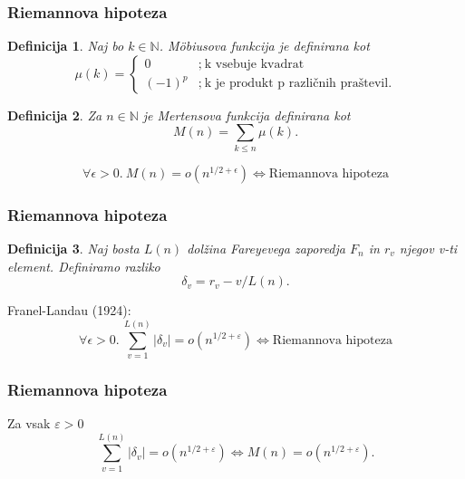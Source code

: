 \documentclass{beamer}
\newtheorem{definicija}{Definicija}
\begin{document}
\begin{frame}
\frametitle{Riemannova hipoteza}

\begin{definicija}
Naj bo $k\in\mathbb{N}$. \emph{M\"obiusova funkcija} je definirana kot
\[
\mu(k) = \left\{
\begin{array}{rl}
0 & ;\ \mbox{k vsebuje kvadrat}\\
(-1)^p & ;\  \mbox{k je produkt p različnih praštevil.}
\end{array}
\right.
\]
\end{definicija}

\pause
\begin{definicija}
Za $n\in\mathbb{N}$ je \emph{Mertensova funkcija} definirana kot
\[ M(n)=\sum_{k\leq n}\mu(k).\]
\end{definicija}

\pause
\[ \forall\epsilon>0.\ M(n) = o(n^{1/2+\epsilon}) \iff \textrm{Riemannova hipoteza} \]

\end{frame}


\begin{frame}
\frametitle{Riemannova hipoteza}

\begin{definicija}
Naj bosta $L(n)$ dolžina Fareyevega zaporedja $F_{n}$ in $r_{v}$ njegov v-ti element. Definiramo razliko
\[ \delta_{v}= r_{v}-v/L(n). \]
\end{definicija}

\pause
Franel-Landau (1924):
\[ \forall\epsilon>0.\ \sum_{v=1}^{L(n)}|\delta_{v}| = o(n^{1/2+\varepsilon}) \iff \textrm{Riemannova hipoteza} \]

\end{frame}


\begin{frame}
\frametitle{Riemannova hipoteza}

Za vsak $\varepsilon > 0$ 
\[ \sum_{v=1}^{L(n)}|\delta_{v}| = o(n^{1/2+\varepsilon}) \iff M(n) = o(n^{1/2+\varepsilon}). \]

\end{frame}

\end{document}
